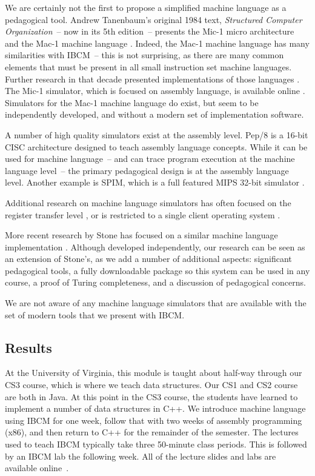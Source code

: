 We are certainly not the first to propose a simplified machine
language as a pedagogical tool.  Andrew Tanenbaum's original 1984
text, {\em Structured Computer Organization}~-- now in its 5th
edition~-- presents the Mic-1 micro architecture and the Mac-1 machine
language \cite{538160}.  Indeed, the Mac-1 machine language has many
similarities with IBCM~-- this is not surprising, as there are many
common elements that must be present in all small instruction set
machine languages.  Further research in that decade presented
implementations of those languages \cite{54147,152757}.  The Mic-1
simulator, which is focused on assembly language, is available online
\cite{mic-1-website}.  Simulators for the Mac-1 machine language do
exist, but seem to be independently developed, and without a modern
set of implementation software.

A number of high quality simulators exist at the assembly level.
Pep/8 \cite{warford:2010:PMT:1734263.1734389,warford2009computer} is a
16-bit CISC architecture designed to teach assembly language concepts.
While it can be used for machine language~-- and can trace program
execution at the machine language level~-- the primary pedagogical
design is at the assembly language level. Another example is SPIM,
which is a full featured MIPS 32-bit simulator \cite{spim-website}.

Additional research on machine language simulators has often focused
on the register transfer level \cite{107081}, or is restricted to a
single client operating system \cite{199795}.

More recent research by Stone has focused on a similar machine
language implementation \cite{1189166}.  Although developed
independently, our research can be seen as an extension of Stone's, as
we add a number of additional aspects: significant pedagogical tools,
a fully downloadable package so this system can be used in any course,
a proof of Turing completeness, and a discussion of pedagogical
concerns.  

We are not aware of any machine language simulators that are available
with the set of modern tools that we present with IBCM.


\subsection{Results}

At the University of Virginia, this module is taught about half-way
through our CS3 course, which is where we teach data structures.  Our
CS1 and CS2 course are both in Java.  At this point in the CS3 course,
the students have learned to implement a number of data structures in
C++.  We introduce machine language using IBCM for one week, follow
that with two weeks of assembly programming (x86), and then return to
C++ for the remainder of the semester.  The lectures used to teach
IBCM typically take three 50-minute class periods.  This is followed
by an IBCM lab the following week.  All of the lecture slides and labs
are available online~\cite{ibcm-website}.

